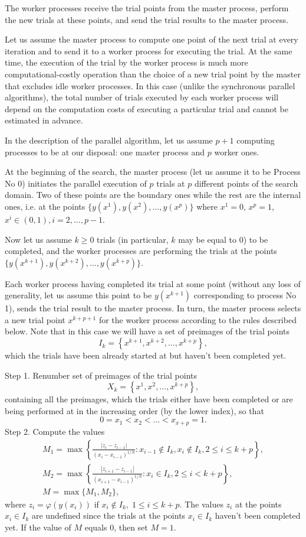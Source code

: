\documentclass{svproc}
\begin{document}
The worker processes receive the trial points from the master process, perform the new trials at these points, and send the trial results to the master process. 

Let us assume the master process to compute one point of the next trial at every iteration and to send it to a worker process for executing the trial. 
At the same time, the execution of the trial by the worker process is much more computational-costly operation than the choice of a new trial point by the master that excludes idle worker processes. 
In this case (unlike the synchronous parallel algorithms), the total number of trials executed by each worker process will depend on the computation costs of executing a particular trial and cannot be estimated in advance.

In the description of the parallel algorithm, let us assume $p+1$ computing processes to be at our disposal: one master process and $p$ worker ones.
 
At the beginning of the search, the master process (let us assume it to be Process No 0) initiates the parallel execution of $p$ trials at $p$ different points of the search domain. 
Two of these points are the boundary ones while the rest are the internal ones, i.e. at the points $\{y(x^1), y(x^2), ...,y(x^p)\}$ where 
$x^1 = 0$, $x^p = 1$, $x^i\in(0,1), i=2,..., p-1$.

Now let us assume $k\geq 0$ trials (in particular, $k$ may be equal to 0) to be completed, and the worker processes are performing the trials at the points $\{y(x^{k+1}), y(x^{k+2}), ...,y(x^{k+p})\}$. 

Each worker process having completed its trial at some point (without any loss of generality, let us assume this point to be $y(x^{k+1})$ corresponding to process No 1), sends the trial result to the master process. 
In turn, the master process selects a new trial point $x^{k+p+1}$ for the worker process according to the rules described below.
Note that in this case we will have a set of preimages of the trial points
\[
I_k = \left\{ x^{k+1},x^{k+2},...,x^{k+p} \right\},
\]
which the trials have been already started at but haven't been completed yet.

Step 1. Renumber set of preimages of the trial points 
\[
X_k = \left\{x^1, x^2,...,x^{k+p} \right\},
\]
containing all the preimages, which the trials either have been completed or are being performed at in the increasing order (by the lower index), so that
\[
0=x_1<x_2<...<x_{x+p}=1.
\]
Step 2. Compute the values 
\begin{gather*}
M_1=\max \left\{ \frac{ \left|z_i - z_{i-1} \right|}{(x_i-x_{i-1})^{1/N}} : x_{i-1} \notin I_k, x_i \notin I_k, 2\leq i\leq k+p \right\},\\
M_2=\max \left\{ \frac{ \left|z_{i+1} - z_{i-1} \right|}{(x_{i+1}-x_{i-1})^{1/N}} : x_i \in I_k, 2\leq i < k+p \right\},\\
M=\max\{M_1,M_2\},
\end{gather*}
where $z_i=\varphi(y(x_i))$ if $x_i \notin I_k, \; 1\leq i \leq k+p$. The values $z_i$ at the points $x_i \in I_k$ are undefined since the trials at the points $x_i \in I_k$ haven't been completed yet. If the value of $M$ equals 0, then set $M=1$.
\end{document}

